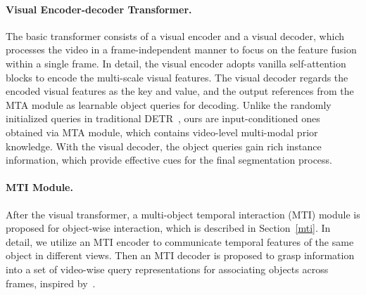 \documentclass{article}
\begin{document}
\paragraph{Visual Encoder-decoder Transformer.}
The basic transformer consists of a visual encoder and a visual decoder, which processes the video in a frame-independent manner to focus on the feature fusion within a single frame. In detail, the visual encoder adopts vanilla self-attention blocks to encode the multi-scale visual features. 
The visual decoder regards the encoded visual features as the key and value, and the output references from the MTA module as learnable object queries for decoding. 
Unlike the randomly initialized queries in traditional DETR~\cite{carion2020end}, ours are input-conditioned ones obtained via MTA module, which contains video-level multi-modal prior knowledge. With the visual decoder, the object queries gain rich instance information, which provide effective cues for the final segmentation process.


\paragraph{MTI Module.}
After the visual transformer, a multi-object temporal interaction (MTI) module is proposed for object-wise interaction, which is described in Section~\ref{mti}. In detail, we utilize an MTI encoder to communicate temporal features of the same object in different views. Then an MTI decoder is proposed to grasp information into a set of video-wise query representations for associating objects across frames, inspired by~\cite{heo2022vita}. 
\end{document}
